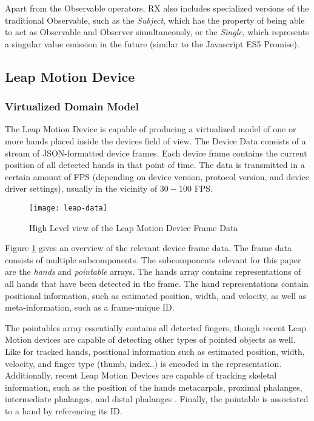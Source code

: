 Apart from the Observable operators, \gls{RX} also includes specialized versions of the traditional Observable, such as the \emph{Subject}, which has the property of being able to act as Observable and Observer simultaneously, or the \emph{Single}, which represents a singular value emission in the future (similar to the Javascript ES5 Promise).


\subsection{Leap Motion Device}
\subsubsection{Virtualized Domain Model}
The Leap Motion Device is capable of producing a virtualized model of one or more hands placed inside the devices field of view. The Device Data consists of a stream of JSON-formatted device frames. Each device frame contains the current position of all detected hands in that point of time. The data is transmitted in a certain amount of \gls{FPS} (depending on device version, protocol version, and device driver settings), usually in the vicinity of $30 - 100$ \gls{FPS}.

\begin{figure}[h]
    \centering
    \texttt{[image: leap-data]}
    \caption{High Level view of the Leap Motion Device Frame Data}
    \label{fig:leap-frame-data}
\end{figure}

Figure \ref{fig:leap-frame-data} gives an overview of the relevant device frame data. The frame data consists of multiple subcomponents. The subcomponents relevant for this paper are the \emph{hands} and \emph{pointable} arrays. The hands array contains representations of all hands that have been detected in the frame. The hand representations contain positional information, such as estimated position, width, and velocity, as well as meta-information, such as a frame-unique ID.

The pointables array essentially contains all detected fingers, though recent Leap Motion devices are capable of detecting other types of pointed objects as well. Like for tracked hands, positional information such as estimated position, width, velocity, and finger type (thumb, index..) is encoded in the representation. Additionally, recent Leap Motion Devices are capable of tracking skeletal information, such as the position of the hands metacarpals, proximal phalanges, intermediate phalanges, and distal phalanges \cite{LeapJsProtocol}. Finally, the pointable is associated to a hand by referencing its ID.


